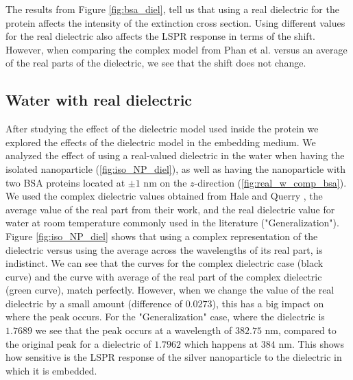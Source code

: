 The results from Figure \ref{fig:bsa_diel}, tell us that using a real dielectric for the protein affects the intensity of the extinction cross section. Using 
different values for the real dielectric also affects the LSPR response in terms of the shift. However, when comparing the complex model from Phan et al. versus
an average of the real parts of the dielectric, we see that the shift does not change. 

\subsection{Water with real dielectric}

After studying the effect of the dielectric model used inside the protein we explored the effects of the dielectric model in the 
embedding medium. We analyzed the effect of using a real-valued dielectric in the water when having the isolated nanoparticle (\ref{fig:iso_NP_diel}), 
as well as having the nanoparticle with two BSA proteins located at $\pm1$ nm on the $z$-direction (\ref{fig:real_w_comp_bsa}). We used
the complex dielectric values obtained from Hale and Querry \cite{HaleQuerry1972}, the average value of the real part from their work, and the real 
dielectric value for water at room temperature commonly used in the literature ("Generalization"). Figure \ref{fig:iso_NP_diel} shows
that using a complex representation of the dielectric versus using the average across the wavelengths of its real part, is indistinct. We can see that the curves
for the complex dielectric case (black curve) and the curve with average of the real part of the complex dielectric (green curve), match perfectly. However, when we
change the value of the real dielectric by a small amount (difference of $0.0273$), this has a big impact on where the peak occurs. For the "Generalization" case, where 
the dielectric is $1.7689$ we see that the peak occurs at a wavelength of $382.75$ nm, compared to the original peak for a dielectric of $1.7962$ which happens at $384$ nm. This shows
how sensitive is the LSPR response of the silver nanoparticle to the dielectric in which it is embedded. 
 
